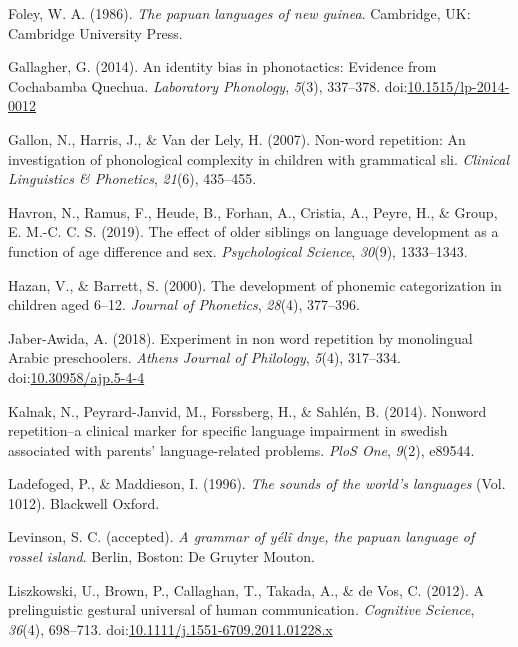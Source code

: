 \documentclass[english,,man,floatsintext]{apa6}
\begin{document}
\hypertarget{ref-foley1986papuan}{}
Foley, W. A. (1986). \emph{The papuan languages of new guinea}.
Cambridge, UK: Cambridge University Press.

\hypertarget{ref-gallagher2014identity}{}
Gallagher, G. (2014). An identity bias in phonotactics: Evidence from
Cochabamba Quechua. \emph{Laboratory Phonology}, \emph{5}(3), 337--378.
doi:\href{https://doi.org/10.1515/lp-2014-0012}{10.1515/lp-2014-0012}

\hypertarget{ref-gallon2007non}{}
Gallon, N., Harris, J., \& Van der Lely, H. (2007). Non-word repetition:
An investigation of phonological complexity in children with grammatical
sli. \emph{Clinical Linguistics \& Phonetics}, \emph{21}(6), 435--455.

\hypertarget{ref-havron2019effect}{}
Havron, N., Ramus, F., Heude, B., Forhan, A., Cristia, A., Peyre, H., \&
Group, E. M.-C. C. S. (2019). The effect of older siblings on language
development as a function of age difference and sex. \emph{Psychological
Science}, \emph{30}(9), 1333--1343.

\hypertarget{ref-hazan2000development}{}
Hazan, V., \& Barrett, S. (2000). The development of phonemic
categorization in children aged 6--12. \emph{Journal of Phonetics},
\emph{28}(4), 377--396.

\hypertarget{ref-jabere2018xperiment}{}
Jaber-Awida, A. (2018). Experiment in non word repetition by monolingual
Arabic preschoolers. \emph{Athens Journal of Philology}, \emph{5}(4),
317--334.
doi:\href{https://doi.org/10.30958/ajp.5-4-4}{10.30958/ajp.5-4-4}

\hypertarget{ref-kalnak2014nonword}{}
Kalnak, N., Peyrard-Janvid, M., Forssberg, H., \& Sahlén, B. (2014).
Nonword repetition--a clinical marker for specific language impairment
in swedish associated with parents' language-related problems.
\emph{PloS One}, \emph{9}(2), e89544.

\hypertarget{ref-ladefoged1996sounds}{}
Ladefoged, P., \& Maddieson, I. (1996). \emph{The sounds of the world's
languages} (Vol. 1012). Blackwell Oxford.

\hypertarget{ref-levinsonYDgrammar}{}
Levinson, S. C. (accepted). \emph{A grammar of yélî dnye, the papuan
language of rossel island}. Berlin, Boston: De Gruyter Mouton.

\hypertarget{ref-liszkowski2012prelinguistic}{}
Liszkowski, U., Brown, P., Callaghan, T., Takada, A., \& de Vos, C.
(2012). A prelinguistic gestural universal of human communication.
\emph{Cognitive Science}, \emph{36}(4), 698--713.
doi:\href{https://doi.org/10.1111/j.1551-6709.2011.01228.x}{10.1111/j.1551-6709.2011.01228.x}
\end{document}
